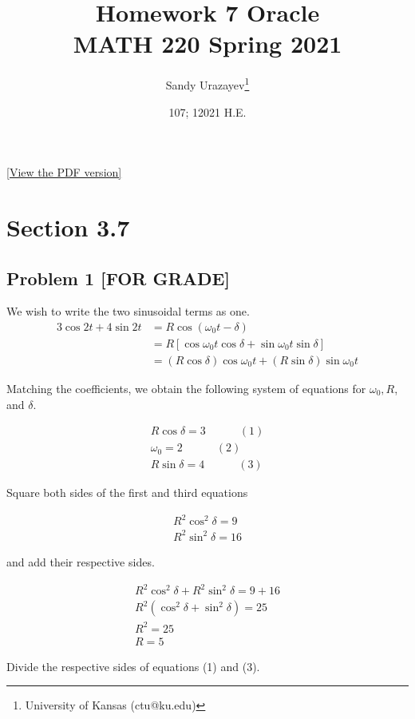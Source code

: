\documentclass[12pt]{article}
\author{Sandy Urazayev\thanks{University of Kansas (ctu@ku.edu)}}
\date{107; 12021 H.E.}
\title{Homework 7 Oracle\\\medskip
\large MATH 220 Spring 2021}
\begin{document}
\maketitle
\href{./index.pdf}{[View the PDF version]​}
\section*{Section 3.7}
\label{sec:orgd213da5}
\subsection*{Problem 1 [FOR GRADE]}
\label{sec:org7780792}
We wish to write the two sinusoidal terms as one.
\begin{align*}
	3 \cos 2 t+4 \sin 2 t & =R \cos \left(\omega_{0} t-\delta\right)                                   \\
	                      & =R\left[\cos \omega_{0} t \cos \delta+\sin \omega_{0} t \sin \delta\right] \\
	                      & =(R \cos \delta) \cos \omega_{0} t+(R \sin \delta) \sin \omega_{0} t
\end{align*}

Matching the coefficients, we obtain the following system of equations for
\(\omega_{0}, R\), and \(\delta\).

\begin{align*}
R \cos \delta=3 \quad \quad \quad (1)\\
\omega_{0}=2 \quad \quad \quad (2)\\
R \sin \delta=4 \quad \quad \quad (3)
\end{align*}

Square both sides of the first and third equations

\begin{align*}
R^{2} \cos ^{2} \delta=9 \\
R^{2} \sin ^{2} \delta=16
\end{align*}

and add their respective sides.

\begin{align*}
R^{2} \cos ^{2} \delta+R^{2} \sin ^{2} \delta=9+16 \\
R^{2}\left(\cos ^{2} \delta+\sin ^{2} \delta\right)=25 \\
R^{2}=25 \\
R=5
\end{align*}

Divide the respective sides of equations (1) and (3).
\end{document}

